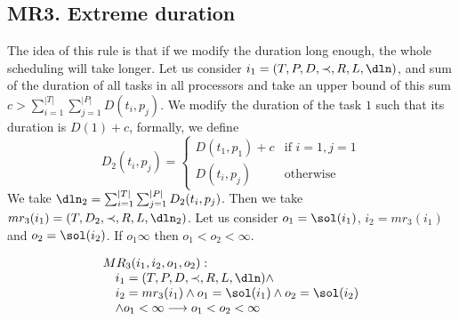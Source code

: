 
















\subsection{MR3. Extreme duration}
The idea of this rule is that if we modify the duration long enough,
the whole scheduling will take longer. Let us consider
$i_{1}=(T, P, D, \prec, R, L, \dln)$, and sum of the duration
of all tasks in all processors and take an upper bound of this sum
$c>\sum_{i=1}^{|T|}\sum_{j=1}^{|P|}D(t_{i},p_{j})$. We modify the
duration of the task $1$ such that its duration is $D(1)+c$, formally, we
define
\begin{displaymath}
  D_{2}(t_{i}, p_{j})=
  \begin{cases}
    D(t_{1}, p_{1}) + c & \text{if } i=1, j=1\\
    D(t_{i}, p_{j}) & \text{otherwise}
  \end{cases}
\end{displaymath}
We take $\dln_{2}=\sum_{i=1}^{|T|}\sum_{j=1}^{|P|}D_{2}(t_{i},p_{j})$.
Then we take $mr_{3}(i_{1})=(T, D_{2}, \prec, R, L, \dln_{2})$. Let us
consider $o_{1}=\sol(i_{1})$, $i_{2}=mr_{3}(i_{1})$ and
$o_{2}=\sol(i_{2})$.
If $o_{1}\infty$ then $o_{1}<o_{2}<\infty$.

\begin{framed}
  \begin{displaymath}
      \begin{array}{l}
    MR_{3}(i_1,i_2,o_{1},o_{2}):\\
      \hskip 1em i_1=(T,P,D,\prec,R,L,\dln) \wedge  \\
      \hskip 1em  i_2=mr_3(i_1)\wedge o_{1}=\sol(i_{1})\wedge o_{2}=\sol(i_2)\\
      \hskip 1em \wedge o_{1}<\infty
      \longrightarrow o_{1}<o_2<\infty
    \end{array}
  \end{displaymath}
\end{framed}


